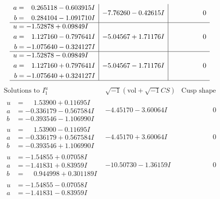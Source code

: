 \documentclass[1p]{elsarticle_modified}
\theoremstyle{definition}
\newcommand{\I}{\sqrt{-1}}
\begin{document}
$$\begin{array}{c|c|c}
\begin{aligned}
a &= \phantom{-}0.265118 - 0.603915 I \\
b &= \phantom{-}0.284104 - 1.091710 I\end{aligned}
 & -7.76260 - 0.42615 I & \phantom{-0.000000 } 0 \\ \hline\begin{aligned}
u &= -1.52878 + 0.09849 I \\
a &= \phantom{-}1.127160 - 0.797641 I \\
b &= -1.075640 - 0.324127 I\end{aligned}
 & -5.04567 + 1.71176 I & \phantom{-0.000000 } 0 \\ \hline\begin{aligned}
u &= -1.52878 - 0.09849 I \\
a &= \phantom{-}1.127160 + 0.797641 I \\
b &= -1.075640 + 0.324127 I\end{aligned}
 & -5.04567 - 1.71176 I & \phantom{-0.000000 } 0\\
 \hline 
 \end{array}$$\newpage$$\begin{array}{c|c|c}  
\text{Solutions to }I^u_{1}& \I (\text{vol} + \sqrt{-1}CS) & \text{Cusp shape}\\
 \hline 
\begin{aligned}
u &= \phantom{-}1.53900 + 0.11695 I \\
a &= -0.336179 - 0.567584 I \\
b &= -0.393546 - 1.106990 I\end{aligned}
 & -4.45170 - 3.60064 I & \phantom{-0.000000 } 0 \\ \hline\begin{aligned}
u &= \phantom{-}1.53900 - 0.11695 I \\
a &= -0.336179 + 0.567584 I \\
b &= -0.393546 + 1.106990 I\end{aligned}
 & -4.45170 + 3.60064 I & \phantom{-0.000000 } 0 \\ \hline\begin{aligned}
u &= -1.54855 + 0.07058 I \\
a &= -1.41831 + 0.83959 I \\
b &= \phantom{-}0.944998 + 0.301189 I\end{aligned}
 & -10.50730 - 1.36159 I & \phantom{-0.000000 } 0 \\ \hline\begin{aligned}
u &= -1.54855 - 0.07058 I \\
a &= -1.41831 - 0.83959 I \\

\end{aligned}
\end{array}$$
\end{document}
